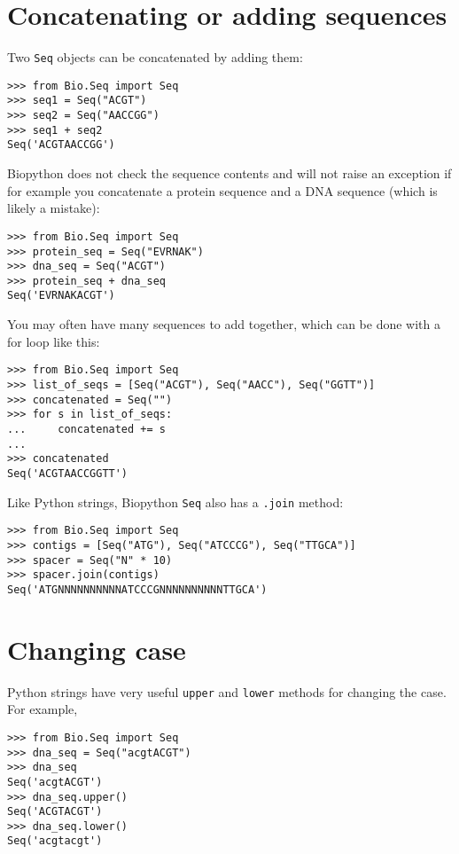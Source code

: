\section{Concatenating or adding sequences}

Two \verb|Seq| objects can be concatenated by adding them:

\begin{verbatim}
>>> from Bio.Seq import Seq
>>> seq1 = Seq("ACGT")
>>> seq2 = Seq("AACCGG")
>>> seq1 + seq2
Seq('ACGTAACCGG')
\end{verbatim}

Biopython does not check the sequence contents and will not raise an exception if for example you concatenate a protein sequence and a DNA sequence (which is likely a mistake):

\begin{verbatim}
>>> from Bio.Seq import Seq
>>> protein_seq = Seq("EVRNAK")
>>> dna_seq = Seq("ACGT")
>>> protein_seq + dna_seq
Seq('EVRNAKACGT')
\end{verbatim}

You may often have many sequences to add together, which can be done with a for loop like this:

\begin{verbatim}
>>> from Bio.Seq import Seq
>>> list_of_seqs = [Seq("ACGT"), Seq("AACC"), Seq("GGTT")]
>>> concatenated = Seq("")
>>> for s in list_of_seqs:
...     concatenated += s
...
>>> concatenated
Seq('ACGTAACCGGTT')
\end{verbatim}

Like Python strings, Biopython \verb|Seq| also has a \verb|.join| method:

\begin{verbatim}
>>> from Bio.Seq import Seq
>>> contigs = [Seq("ATG"), Seq("ATCCCG"), Seq("TTGCA")]
>>> spacer = Seq("N" * 10)
>>> spacer.join(contigs)
Seq('ATGNNNNNNNNNNATCCCGNNNNNNNNNNTTGCA')
\end{verbatim}

\section{Changing case}

Python strings have very useful \verb|upper| and \verb|lower| methods for changing the case.
For example,

\begin{verbatim}
>>> from Bio.Seq import Seq
>>> dna_seq = Seq("acgtACGT")
>>> dna_seq
Seq('acgtACGT')
>>> dna_seq.upper()
Seq('ACGTACGT')
>>> dna_seq.lower()
Seq('acgtacgt')
\end{verbatim}

